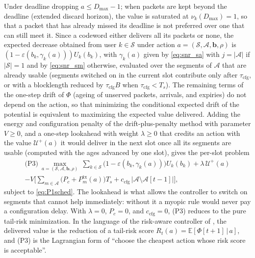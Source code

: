 \documentclass[journal]{IEEEtran}
\newcommand{\E}{\mathbb{E}}
\newcommand{\Dmax}{D_{\max}}
\newcommand{\vect}[1]{\bm{#1}}
\newcommand{\Sset}{\mathcal{S}}
\begin{document}
Under deadline dropping $a\le\Dmax-1$; when packets are kept beyond the deadline (extended discard horizon), the value is saturated at $\nu_k(\Dmax)=1$, so that a packet that has already missed its deadline is not preferred over one that can still meet it. Since a codeword either delivers all its packets or none, the expected decrease obtained from user $k\in\Sset$ under action $a=(\Sset,\mathcal A,\vect b,\rho)$ is $(1-\varepsilon(b_k,\gamma_k(a)))U_k(b_k)$, with $\gamma_k(a)$ given by \eqref{eq:snr_sa} with $j=|\mathcal A|$ if $|\Sset|=1$ and by \eqref{eq:snr_sm} otherwise, evaluated over the segments of $\mathcal A$ that are already usable (segments switched on in the current slot contribute only after $\tau_{\mathrm{cfg}}$, or with a blocklength reduced by $\tau_{\mathrm{cfg}}B$ when $\tau_{\mathrm{cfg}}<T_s$). The remaining terms of the one-step drift of $\Phi$ (ageing of unserved packets, arrivals, and expiries) do not depend on the action, so that minimizing the conditional expected drift of the potential is equivalent to maximizing the expected value delivered. Adding the energy and configuration penalty of the drift-plus-penalty method \cite{Neely2010} with parameter $V\ge0$, and a one-step lookahead with weight $\lambda\ge0$ that credits an action with the value $\mathcal U^{+}(a)$ it would deliver in the next slot once all its segments are usable (computed with the ages advanced by one slot), gives the per-slot problem
\begin{multline}\label{eq:P3}
\text{(P3)}\ \max_{a=(\Sset,\mathcal A,\vect b,\rho)}\ \sum_{k\in\Sset}\big(1-\varepsilon(b_k,\gamma_k(a))\big)U_k(b_k)+\lambda\,\mathcal U^{+}(a)\\-V\Big[\sum_{m\in\mathcal A}\big(P_c+P_m^{\mathrm{tx}}(a)\big)T_s+c_{\mathrm{cfg}}\,|\mathcal A\setminus\mathcal A[t-1]|\Big],
\end{multline}
subject to \eqref{eq:P1sched}. The lookahead is what allows the controller to switch on segments that cannot help immediately: without it a myopic rule would never pay a configuration delay. With $\lambda=0$, $P_c=0$, and $c_{\mathrm{cfg}}=0$, (P3) reduces to the pure tail-risk minimization. In the language of the risk-aware controller of \cite{Bennis2018}, the delivered value is the reduction of a tail-risk score $R_t(a)=\E[\Phi[t+1]\,|\,a]$, and (P3) is the Lagrangian form of ``choose the cheapest action whose risk score is acceptable''.
\end{document}
